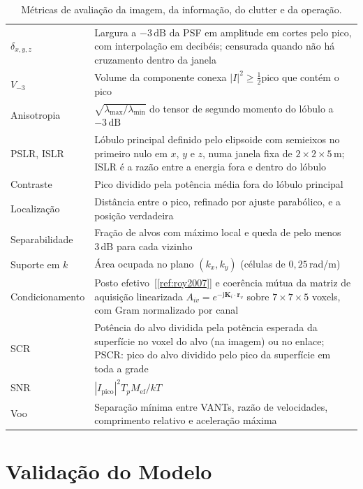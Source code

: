 \documentclass[12pt,a4paper,oneside]{book}
\theoremstyle{remark}
\newcommand{\vect}[1]{\boldsymbol{#1}}
\newcommand{\jj}{\mathrm{j}}
\newcommand{\dB}{\,\mathrm{dB}}
\newcommand{\citar}[1]{[\ref{ref:#1}]}
\theoremstyle{plain}
\theoremstyle{definition}
\begin{document}
\begin{table}[H]
\centering\small
\caption{Métricas de avaliação da imagem, da informação, do clutter e da
operação.}
\label{tab:metricas}
\begin{tabular}{@{}L{3.3cm}L{11.0cm}@{}}
\toprule
$\delta_{x,y,z}$ & Largura a $-3\dB$ da PSF em amplitude em cortes pelo pico,
                   com interpolação em decibéis; censurada quando não há
                   cruzamento dentro da janela \\
$V_{-3}$ & Volume da componente conexa $|I|^2\ge\tfrac12$pico que contém o pico \\
Anisotropia & $\sqrt{\lambda_{\max}/\lambda_{\min}}$ do tensor de segundo momento do lóbulo a $-3\dB$ \\
PSLR, ISLR & Lóbulo principal definido pelo elipsoide com semieixos no primeiro nulo
             em $x$, $y$ e $z$, numa janela fixa de $2\times2\times5\,$m; ISLR é a razão
             entre a energia fora e dentro do lóbulo \\
Contraste & Pico dividido pela potência média fora do lóbulo principal \\
Localização & Distância entre o pico, refinado por ajuste parabólico, e a posição verdadeira \\
Separabilidade & Fração de alvos com máximo local e queda de pelo menos $3\dB$ para cada vizinho \\
Suporte em $k$ & Área ocupada no plano $(k_x,k_y)$ (células de $0,25\,$rad/m) \\
Condicionamento & Posto efetivo~\citar{roy2007} e coerência mútua da matriz de aquisição
                  linearizada $A_{iv}=e^{-\jj\vect K_i\cdot\vect r_v}$ sobre
                  $7\times7\times5$ voxels, com Gram normalizado por canal \\
SCR & Potência do alvo dividida pela potência esperada da superfície no voxel do
      alvo (na imagem) ou no enlace; PSCR: pico do alvo dividido pelo pico da
      superfície em toda a grade \\
SNR & $|I_{\text{pico}}|^2T_pM_{\text{ef}}/kT$ \\
Voo & Separação mínima entre VANTs, razão de velocidades, comprimento relativo e aceleração máxima \\
\bottomrule
\end{tabular}
\end{table}

\section{Validação do Modelo}
\label{sec:mod_valid}
\end{document}
